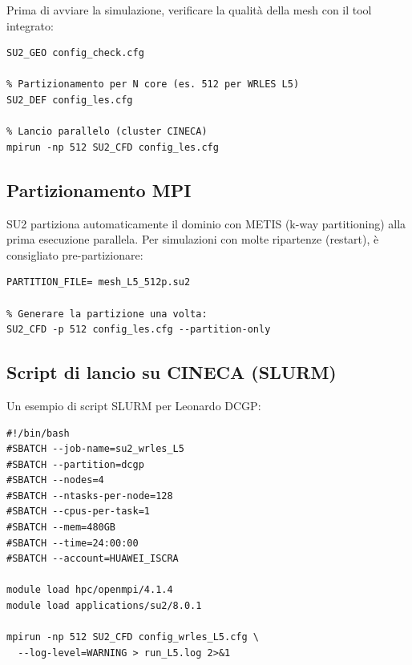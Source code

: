\documentclass[11pt,a4paper]{article}
\begin{document}
Prima di avviare la simulazione, verificare la qualità della mesh con il tool integrato:

\begin{lstlisting}[style=SU2cfg, caption={Comandi per verifica mesh e partizionamento.}, label={lst:geo}]
% Verifica geometria e qualit mesh
SU2_GEO config_check.cfg

% Partizionamento per N core (es. 512 per WRLES L5)
SU2_DEF config_les.cfg

% Lancio parallelo (cluster CINECA)
mpirun -np 512 SU2_CFD config_les.cfg
\end{lstlisting}

\subsection{Partizionamento MPI}

SU2 partiziona automaticamente il dominio con METIS (k-way partitioning) alla prima esecuzione parallela. Per simulazioni con molte ripartenze (restart), è consigliato pre-partizionare:

\begin{lstlisting}[style=SU2cfg, caption={Pre-partizionamento esplicito per riduire il tempo di avvio.}, label={lst:part}]
% Nel config, aggiungere:
PARTITION_FILE= mesh_L5_512p.su2

% Generare la partizione una volta:
SU2_CFD -p 512 config_les.cfg --partition-only
\end{lstlisting}

\subsection{Script di lancio su CINECA (SLURM)}

Un esempio di script SLURM per Leonardo DCGP:

\begin{lstlisting}[style=SU2cfg, caption={Script SLURM per SU2 WRLES su Leonardo DCGP (4 nodi, 128 core per nodo = 512 core totali).}, label={lst:slurm}]
#!/bin/bash
#SBATCH --job-name=su2_wrles_L5
#SBATCH --partition=dcgp
#SBATCH --nodes=4
#SBATCH --ntasks-per-node=128
#SBATCH --cpus-per-task=1
#SBATCH --mem=480GB
#SBATCH --time=24:00:00
#SBATCH --account=HUAWEI_ISCRA

module load hpc/openmpi/4.1.4
module load applications/su2/8.0.1

mpirun -np 512 SU2_CFD config_wrles_L5.cfg \
  --log-level=WARNING > run_L5.log 2>&1
\end{lstlisting}
\end{document}

